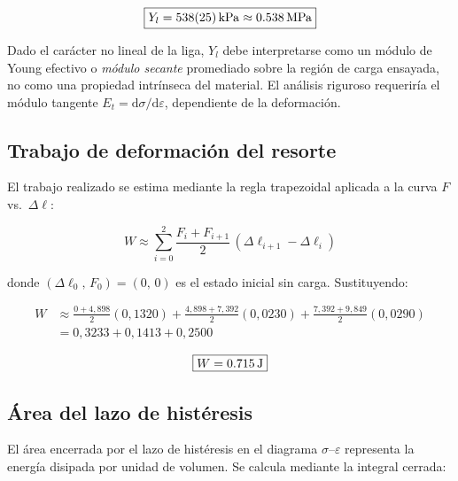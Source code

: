 \begin{equation}
    \boxed{Y_l = \qty{538 \pm 25}{kPa} \approx \qty{0{,}538}{MPa}}
    \label{eq:Young_liga}
\end{equation}

Dado el carácter no lineal de la liga, $Y_l$ debe interpretarse como un
módulo de Young efectivo o \textit{módulo secante} promediado sobre la
región de carga ensayada, no como una propiedad intrínseca del material.
El análisis riguroso requeriría el módulo tangente
$E_t = \mathrm{d}\sigma/\mathrm{d}\varepsilon$, dependiente de la
deformación.

\subsection{Trabajo de deformación del resorte}

El trabajo realizado se estima mediante la regla trapezoidal aplicada 
a la curva $F$ vs.\ $\Delta\ell$:

\begin{equation}
    W \approx \sum_{i=0}^{2}
      \frac{F_i + F_{i+1}}{2}\,(\Delta\ell_{i+1} - \Delta\ell_i)
    \label{eq:trabajo_trap}
\end{equation}

donde $(\Delta\ell_0,\,F_0) = (0,\,0)$ es el estado inicial sin carga.
Sustituyendo:

\begin{align*}
    W &\approx \frac{0 + 4{,}898}{2}(0{,}1320)
             + \frac{4{,}898 + 7{,}392}{2}(0{,}0230)
             + \frac{7{,}392 + 9{,}849}{2}(0{,}0290)\\[6pt]
      &= 0{,}3233 + 0{,}1413 + 0{,}2500
\end{align*}

\begin{equation}
    \boxed{W = \qty{0{,}715}{J}}
    \label{eq:trabajo}
\end{equation}

\subsection{Área del lazo de histéresis}

El área encerrada por el lazo de histéresis en el diagrama 
$\sigma$--$\varepsilon$ representa la energía disipada por unidad de 
volumen. Se calcula mediante la integral cerrada:

